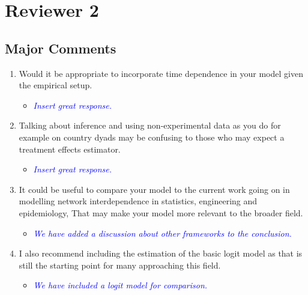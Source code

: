 \section{Reviewer 2}

\subsection{Major Comments}

\begin{enumerate}
	\item Would it be appropriate to incorporate time dependence in your model given the empirical setup.
	\begin{itemize}
		\item \textcolor{blue}{ \emph{
		Insert great response.
		}}
	\end{itemize}
	\item Talking about inference and using non-experimental data as you do for example on country dyads may be confusing to those who may expect a treatment effects estimator.
	\begin{itemize}
		\item \textcolor{blue}{ \emph{
		Insert great response.
		}}
	\end{itemize}	
	\item It could be useful to compare your model to the current work going on in modelling network interdependence in statistics, engineering and epidemiology, That may make your model more relevant to the broader field.
	\begin{itemize}
		\item \textcolor{blue}{ \emph{
		We have added a discussion about other frameworks to the conclusion.
		}}
	\end{itemize}	
	\item I also recommend including the estimation of the basic logit model as that is still the starting point for many approaching this field.
	\begin{itemize}
		\item \textcolor{blue}{ \emph{
		We have included a logit model for comparison.
		}}
	\end{itemize}	
\end{enumerate}
